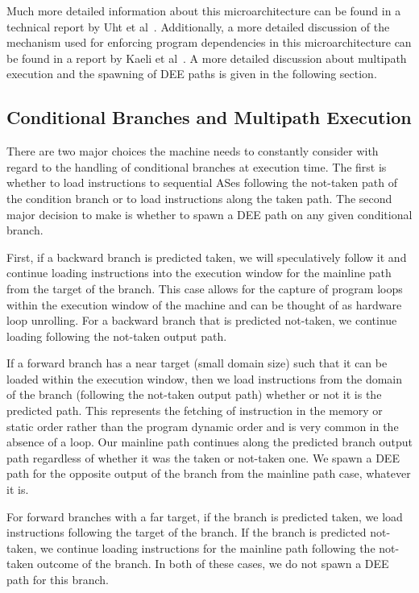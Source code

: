 \documentclass[10pt,dvips]{article}
\begin{document}
Much more detailed information about this microarchitecture
can be found in a technical report by Uht et al~\cite{Uht01}.
Additionally, a more detailed discussion of the mechanism used for
enforcing program dependencies in this microarchitecture
can be found in a report by Kaeli et al~\cite{Kaeli01}.
A more detailed discussion about multipath execution and
the spawning of DEE paths is given in the following section.
%
%
\subsection{Conditional Branches and Multipath Execution}
%
There are two major choices the machine needs to constantly
consider with regard to the handling of conditional branches at
execution time.
The first is whether to load instructions to sequential
ASes following
the not-taken path of the condition branch or to load instructions
along the taken path.  
The second major decision to make is
whether to spawn a DEE path
on any given conditional branch.

First, if a backward branch is predicted taken,
we will speculatively follow it and continue loading instructions
into the execution window for the mainline path from the target
of the branch.  
This case allows for the capture of program loops
within the execution window of the machine and can be thought of
as hardware loop unrolling.
For a backward branch that
is predicted not-taken, we continue loading following the
not-taken output path.

If a forward branch has a near target (small domain size) such
that it can be loaded within the execution window, 
then we
load instructions from the domain of the branch (following the
not-taken output path) whether or not it is the predicted path.
This represents the fetching of instruction in the 
memory or static order rather than the program dynamic order and
is very common in the absence of a loop.
Our mainline path continues along the predicted branch output path
regardless of whether it was the taken or not-taken one.  
We spawn a DEE path
for the opposite output of the branch from
the mainline path case, whatever it is.

For forward branches with a far target,
if the branch is predicted taken, we load instructions following the target
of the branch.  If the branch is predicted not-taken, we continue
loading instructions for the mainline path following the not-taken
outcome of the branch.  In both of these cases, we do not
spawn a DEE path for this branch.
\end{document}
